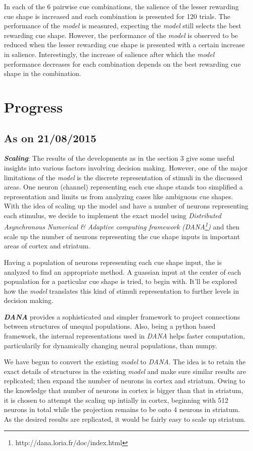 \documentclass[11pt]{article}
\begin{document}
In each of the 6 pairwise cue combinations, the salience of the lesser rewarding cue shape is increased and each combination is presented for 120 trials. The performance of the \emph{model} is measured, expecting the \emph{model} still selects the best rewarding cue shape. However, the performance of the \emph{model} is observed to be reduced when the lesser rewarding cue shape is presented with a certain increase in salience. Interestingly, the increase of salience after which the \emph{model} performance decreases for each combination depends on the best rewarding cue shape in the combination. 

\section{Progress}
\subsection{As on 21/08/2015}
\textbf{\emph{Scaling}}: The results of the developments as in the section 3 give some useful insights into various factors involving decision making. However, one of the major limitations of the \emph{model} is the discrete representation of stimuli in the discussed areas. One neuron (channel) representing each cue shape stands too simplified a representation and limits us from analyzing cases like ambiguous cue shapes. With the idea of scaling up the model and have a number of neurons representing each stimulus, we decide to implement the exact model using \emph{Distributed Asynchronous Numerical \& Adaptive computing framework (DANA\footnote{http://dana.loria.fr/doc/index.html})} and then scale up the number of neurons representing the cue shape inputs in important areas of cortex and striatum.\par
Having a population of neurons representing each cue shape input, the is analyzed to find an appropriate method. A guassian input at the center of each popualation for a particular cue shape is tried, to begin with. It'll be explored how the \emph{model} translates this kind of stimuli representation to further levels in decision making.  \par
\textbf{\emph{DANA}} provides a sophisticated and simpler framework to project connections between structures of unequal populations. Also, being a python based framework, the internal representations used in \emph{DANA} helps faster computation, particularily for dynamically changing neural populations, than numpy.
\par
We have begun to convert the existing \emph{model} to \emph{DANA}. The idea is to retain the exact details of structures in the existing \emph{model} and make sure similar results are replicated; then expand the number of neurons in cortex and striatum. Owing to the knowledge that number of neurons in cortex is bigger than that in striatum, it is chosen to attempt the scaling up intially in cortex, beginning with 512 neurons in total while the projection remains to be onto 4 neurons in striatum. As the desired results are replicated, it would be fairly easy to scale up striatum.\par
\end{document}
